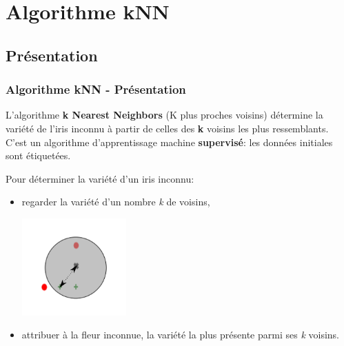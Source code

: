 \documentclass[svgnames,11pt]{beamer}
\begin{document}
\section{Algorithme kNN}
\subsection{Présentation}
\begin{frame}
    \frametitle{Algorithme kNN - Présentation}

    \begin{aretenir}[]
        L'algorithme \textbf{k Nearest Neighbors} (K plus proches voisins) détermine la variété de l'iris inconnu à partir de celles des \textbf{k} voisins les plus ressemblants.\\
        C'est un algorithme d'apprentissage machine \textbf{supervisé}: les données initiales sont étiquetées.
    \end{aretenir}

\end{frame}
\begin{frame}

    Pour déterminer la variété d'un iris inconnu:
    \begin{itemize}
        \item<1-> regarder la variété d'un nombre \emph{k} de voisins,
              \begin{center}
                  \includegraphics[width=4cm]{ressources/zoom-k3-slides.png}
              \end{center}
        \item <2-> attribuer à la fleur inconnue, la variété la plus présente parmi ses \emph{k} voisins.
    \end{itemize}

\end{frame}
\end{document}
